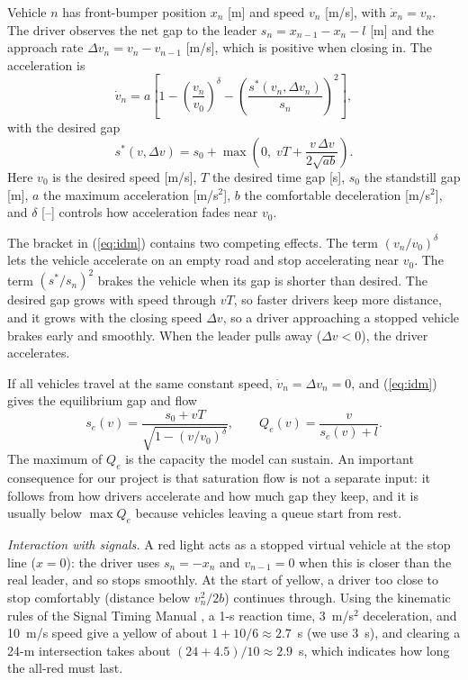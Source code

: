 \documentclass[letterpaper,12pt,conference]{ieeeconf}
\begin{document}
Vehicle $n$ has front-bumper position $x_n$ [m] and speed $v_n$
[m/s], with $\dot x_n=v_n$. The driver observes the net gap to the
leader $s_n=x_{n-1}-x_n-l$ [m] and the approach rate
$\Delta v_n=v_n-v_{n-1}$ [m/s], which is positive when closing in.
The acceleration is
\begin{equation}
\dot v_n=a\left[1-\left(\frac{v_n}{v_0}\right)^{\delta}
-\left(\frac{s^*(v_n,\Delta v_n)}{s_n}\right)^{2}\right],
\label{eq:idm}
\end{equation}
with the desired gap
\begin{equation}
s^*(v,\Delta v)=s_0+\max\!\left(0,\;vT+\frac{v\,\Delta v}{2\sqrt{ab}}\right).
\label{eq:sstar}
\end{equation}
Here $v_0$ is the desired speed [m/s], $T$ the desired time gap
[s], $s_0$ the standstill gap [m], $a$ the maximum acceleration
[m/s$^2$], $b$ the comfortable deceleration [m/s$^2$], and
$\delta$ [--] controls how acceleration fades near $v_0$.

The bracket in (\ref{eq:idm}) contains two competing effects. The
term $(v_n/v_0)^\delta$ lets the vehicle accelerate on an empty road
and stop accelerating near $v_0$. The term $(s^*/s_n)^2$ brakes the
vehicle when its gap is shorter than desired. The desired gap
grows with speed through $vT$, so faster drivers keep more
distance, and it grows with the closing speed $\Delta v$, so a
driver approaching a stopped vehicle brakes early and smoothly.
When the leader pulls away ($\Delta v<0$), the driver accelerates.

If all vehicles travel at the same constant speed,
$\dot v_n=\Delta v_n=0$, and (\ref{eq:idm}) gives the equilibrium
gap and flow
\begin{equation}
s_e(v)=\frac{s_0+vT}{\sqrt{1-(v/v_0)^{\delta}}},\qquad
Q_e(v)=\frac{v}{s_e(v)+l}.
\label{eq:equil}
\end{equation}
The maximum of $Q_e$ is the capacity the model can sustain. An
important consequence for our project is that saturation flow is
not a separate input: it follows from how drivers accelerate and
how much gap they keep, and it is usually below $\max Q_e$ because
vehicles leaving a queue start from rest.

\emph{Interaction with signals.} A red light acts as a stopped
virtual vehicle at the stop line ($x=0$): the driver uses
$s_n=-x_n$ and $v_{n-1}=0$ when this is closer than the real
leader, and so stops smoothly. At the start of yellow, a driver
too close to stop comfortably (distance below $v_n^2/2b$)
continues through. Using the kinematic rules of the Signal Timing
Manual \cite{stm2015}, a 1-s reaction time, 3~m/s$^2$ deceleration,
and 10~m/s speed give a yellow of about $1+10/6\approx2.7$~s (we
use 3~s), and clearing a 24-m intersection takes about
$(24+4.5)/10\approx2.9$~s, which indicates how long the all-red
must last.
\end{document}

